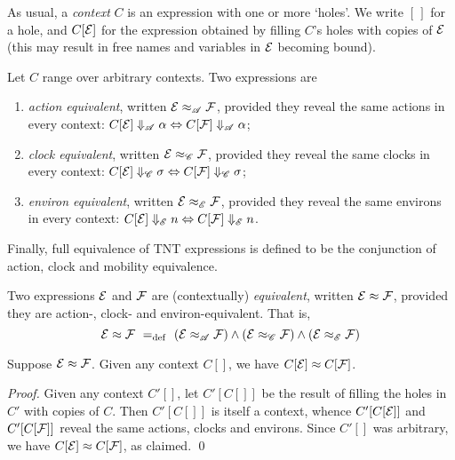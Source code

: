 \documentclass[orivec,envcountsame]{llncs}
\newcommand{\Reveals}[1]{\mathrel{\Downarrow_{#1}}}
\newcommand{\RevealsA}{\Reveals{\mathscr{A}}}
\newcommand{\RevealsC}{\Reveals{\mathscr{C}}}
\newcommand{\RevealsE}{\Reveals{\mathscr{E}}}
\newcommand{\Eq}{\approx}
\newcommand{\EqA}{\mathrel{\Eq_{\mathscr{A}}}}
\newcommand{\EqC}{\mathrel{\Eq_{\mathscr{C}}}} %
\newcommand{\EqE}{\mathrel{\Eq_{\mathscr{E}}}} %
\newcommand{\Means}{\mathrel{~=_{\mathrm{def}}~}}
\begin{document}
As usual, a \emph{context} $C$ is an expression with one or more
`holes'. We write $[\,]$ for a hole, and $C[\text{$\mathcal{E}$}]$ for the expression
obtained by filling $C$'s holes with copies of $\text{$\mathcal{E}$}$ (this may result
in free names and variables in $\text{$\mathcal{E}$}$ becoming bound).

\begin{definition}
Let $C$ range over arbitrary contexts. Two expressions are
\begin{enumerate}
\item
    \emph{action equivalent}, written $\expr \EqA \exprb$, provided they
     reveal the same actions in every context: $C[\expr] \RevealsA
     \alpha \Leftrightarrow C[\exprb] \RevealsA \alpha$;
\item
    \emph{clock equivalent}, written $\expr \EqC \exprb$, provided they
     reveal the same clocks in every context: $C[\expr] \RevealsC \sigma
     \Leftrightarrow C[\exprb] \RevealsC \sigma$;

\item
    \emph{environ equivalent}, written $\expr \EqE \exprb$, provided
     they reveal the same environs in every context: $C[\expr] \RevealsE
     n \Leftrightarrow C[\exprb] \RevealsE n$.
\end{enumerate}
\end{definition}

Finally, full equivalence of TNT expressions is defined to be the
conjunction of action, clock and mobility equivalence.
\begin{definition}
Two expressions $\text{$\mathcal{E}$}$ and $\text{$\mathcal{F}$}$ are (contextually)
\emph{equivalent}, written $\expr \Eq \exprb$, provided they are
action-, clock- and environ-equivalent. That is,
\[
    \expr \Eq \exprb
    \Means
    \left( \expr \EqA \exprb \right)
    \land
    \left( \expr \EqC \exprb \right)
    \land 
    \left( \expr \EqE \exprb \right)
\]
\end{definition}


\begin{proposition}
\label{prop:context-substitution} 
Suppose $\expr \Eq \exprb$. Given any context $C[]$, we have $C[\expr]
\Eq C[\exprb]$.
\end{proposition}
\begin{proof}
Given any context $C'[]$, let $C'[C[]]$ be the result of filling the
holes in $C'$ with copies of $C$. Then $C'[C[]]$ is itself a context,
whence $C'[C[\text{$\mathcal{E}$}]]$ and $C'[C[\text{$\mathcal{F}$}]]$ reveal the same actions,
clocks and environs. Since $C'[]$ was arbitrary, we have $C[\expr] \Eq
C[\exprb]$, as claimed.  \qed \end{proof}
\end{document}
